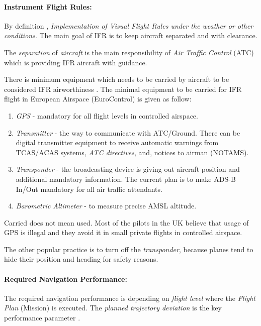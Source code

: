 \paragraph{Instrument Flight Rules:} By definition \cite{icaoAnnex2}, \emph{Implementation of Visual Flight Rules under the weather or other conditions}. The main goal of IFR is to keep aircraft separated and with clearance.

The \emph{separation} of \emph{aircraft} is the main responsibility of \emph{Air Traffic Control} (ATC) which is providing IFR aircraft with guidance.

There is minimum equipment which needs to be carried by aircraft to be considered IFR airworthiness \cite{icao4444}. The minimal equipment to be carried for IFR flight in European Airspace (EuroControl) is given as follow:
\begin{enumerate}
    \item \emph{GPS} - mandatory for all flight levels in controlled airspace. 
    
    \item \emph{Transmitter} - the way to communicate with ATC/Ground. There can be digital transmitter equipment to receive automatic warnings from TCAS/ACAS systems, \emph{ATC directives}, and, notices to airman (NOTAMS).
    
    \item \emph{Transponder} - the broadcasting device is giving out aircraft position and additional mandatory information. The current plan is to make ADS-B In/Out mandatory for all air traffic attendants.
    
    \item \emph{Barometric Altimeter} - to measure precise AMSL altitude.
\end{enumerate}


\begin{note}
    Carried does not mean used. Most of the pilots in the UK believe that usage of GPS is illegal and they avoid it in small private flights in controlled airspace.
    
    The other popular practice is to turn off the \emph{transponder}, because planes tend to hide their position and heading for safety reasons.
\end{note}

\paragraph{Required Navigation Performance:} The required navigation performance is depending on \emph{flight level} where the \emph{Flight Plan} (Mission) is executed. The \emph{planned trajectory deviation} is the key performance parameter \cite{icao4444}.